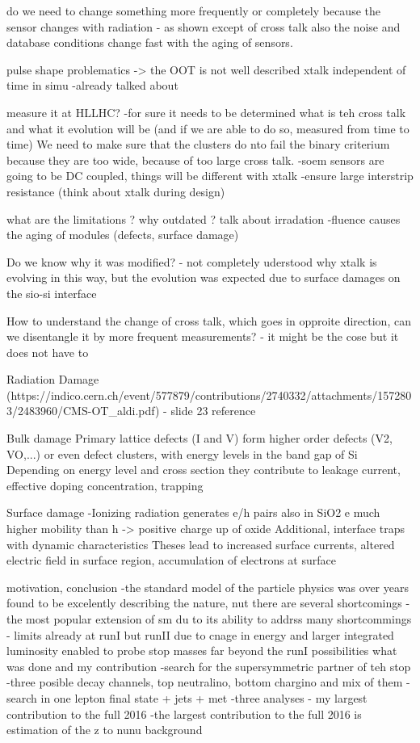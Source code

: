 do we need to change something more frequently or completely because the sensor changes with radiation
	- as shown except of cross talk also the noise and database conditions change fast with the aging of sensors.


pulse shape problematics -> the OOT is not well described
xtalk independent of time in simu
	-already talked about


measure it at HLLHC?
	-for sure it needs to be determined what is teh cross talk and what it evolution will be (and if we are able to do so, measured from time to time) We need to make sure that the clusters do nto fail the binary criterium because they are too wide, because of too large cross talk. 
	-soem sensors are going to be DC coupled, things will be different with xtalk
	-ensure large interstrip resistance (think about xtalk during design) 

what are the limitations ?
why outdated ? talk about irradation
	-fluence causes the aging of modules (defects, surface damage)

Do we know why it was modified?
	- not completely uderstood why xtalk is evolving in this way, but the evolution was expected due to surface damages on the sio-si interface

How to understand the change of cross talk, which goes in opproite direction, can we disentangle it by more frequent measurements?
	- it might be the cose but it does not have to

Radiation Damage (https://indico.cern.ch/event/577879/contributions/2740332/attachments/1572803/2483960/CMS-OT_aldi.pdf) - slide 23 reference

Bulk damage
	Primary lattice defects (I and V) form higher order defects (V2, VO,...) or even defect clusters, with energy levels in the band gap of Si
	Depending on energy level and cross section they contribute to leakage current, effective doping concentration, trapping

Surface damage
	-Ionizing radiation generates e/h pairs also in SiO2 
	e much higher mobility than h -> positive charge up of oxide
	Additional, interface traps with dynamic characteristics
	Theses lead to increased surface currents, altered electric field in surface region, accumulation of electrons at surface


motivation, conclusion
	-the standard model of the particle physics was over years found to be excelently describing the nature, nut there are several shortcomings
	-the most popular extension of sm du to its ability to addrss many shortcommings
	- limits already at runI but runII due to cnage in energy and larger integrated luminosity enabled to probe stop masses far beyond the runI possibilities
what was done and my contribution
	-search for the supersymmetric partner of teh stop
	-three posible decay channels, top neutralino, bottom chargino and mix of them
	-search in one lepton final state + jets + met
	-three analyses - my largest contribution to the full 2016
	-the largest contribution to the full 2016 is estimation of the z to nunu background

